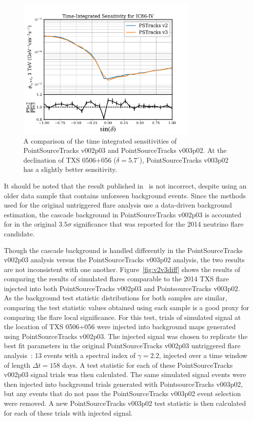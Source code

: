 \begin{figure}[h]
\centering
\includegraphics[width=0.8\textwidth]{figs/v2v3_senscompare.pdf}
\caption{A comparison of the time integrated sensitivities of PointSourceTracks v002p03 and PointSourceTracks v003p02. At the declination of TXS 0506+056 ($\delta=5.7^{\circ}$), PointSourceTracks v003p02 has a slightly better sensitivity. }
\label{fig:senscompare}
\end{figure}

It should be noted that the result published in~\cite{TXS_Archival} is not incorrect, despite using an older data sample that contains unforseen background events. Since the methods used for the original untriggered flare analysis use a data-driven background estimation, the cascade background in PointSourceTracks v002p03 is accounted for in the original $3.5 \sigma$ significance that was reported for the 2014 neutrino flare candidate. 

Though the cascade background is handled differently in the PointSourceTracks v002p03 analysis versus the PointSourceTracks v003p02 analysis, the two results are not inconsistent with one another. Figure~\ref{fig:v2v3diff} shows the results of comparing the results of simulated flares comparable to the 2014 TXS flare injected into both PointSourceTracks v002p03 and PointsourceTracks v003p02.   As the background test statistic distributions for both samples are similar, comparing the test statistic values obtained using each sample is a good proxy for comparing the flare local significance.  For this test, trials of simulated signal at the location of TXS 0506+056 were injected into background maps generated using PointSourceTracks v002p03. The injected signal was chosen to replicate the best fit parameters in the original PointSourceTracks v002p03 untriggered flare analysis~\cite{TXS_Archival}: 13 events with a spectral index of $\gamma=2.2$, injected over a time window of length $\Delta t = 158$ days. A test statistic for each of these PointSourceTracks v002p03 signal trials was then calculated. The same simulated signal events were then injected into background trials generated with PointsourceTracks v003p02, but any events that do not pass the PointSourceTracks v003p02 event selection were removed.  A new PointSourceTracks v003p02 test statistic is then calculated for each of these trials with injected signal. 

